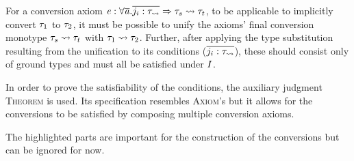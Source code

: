 For a conversion axiom $\mathit{e} : \forall \overline{\mathit{a}}.\overline{j_i:\mathit{\tau_{\rightsquigarrow}}} \Rightarrow \mathit{\tau}_s \rightsquigarrow \mathit{\tau}_t$, to be applicable to implicitly convert $\mathit{\tau}_1$ to $\mathit{\tau}_2$, it must be possible to unify the axioms' final conversion monotype $\mathit{\tau}_s \rightsquigarrow \mathit{\tau}_t$ with $\mathit{\tau}_1 \rightsquigarrow \mathit{\tau}_2$. Further, after applying the type substitution resulting from the unification to its conditions ($\overline{j_i:\mathit{\tau_{\rightsquigarrow}}}$), these should consist only of ground types and must all be satisfied under $I$.

In order to prove the satisfiability of the conditions, the auxiliary judgment \textsc{Theorem} is used. Its specification resembles \textsc{Axiom}'s but it allows for the conversions to be satisfied by composing multiple conversion axioms.

The highlighted parts are important for the construction of the conversions but can be ignored for now.

